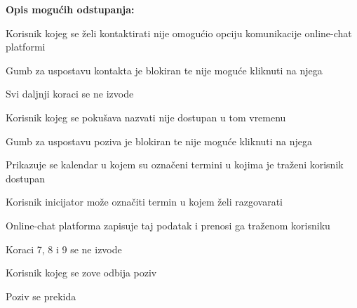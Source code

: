 \begin{packed_item}
						\item  \textbf{Opis mogućih odstupanja:}
							\begin{packed_item}
								\item[1.a] Korisnik kojeg se želi kontaktirati nije omogućio opciju komunikacije online-chat platformi
								\begin{packed_enum}
									\item Gumb za uspostavu kontakta je blokiran te nije moguće kliknuti na njega
									\item Svi daljnji koraci se ne izvode
								\end{packed_enum}
								\item[6.a] Korisnik kojeg se pokušava nazvati nije dostupan u tom vremenu
								\begin{packed_enum}
									\item Gumb za uspostavu poziva je blokiran te nije moguće kliknuti na njega
									\item Prikazuje se kalendar u kojem su označeni termini u kojima je traženi korisnik dostupan
									\item Korisnik inicijator može označiti termin u kojem želi razgovarati
									\item Online-chat platforma zapisuje taj podatak i prenosi ga traženom korisniku
									\item Koraci 7, 8 i 9 se ne izvode
								\end{packed_enum}
								\item[8.a] Korisnik kojeg se zove odbija poziv
								\begin{packed_enum}
									\item Poziv se prekida
								\end{packed_enum}
							\end{packed_item}
					\end{packed_item}



